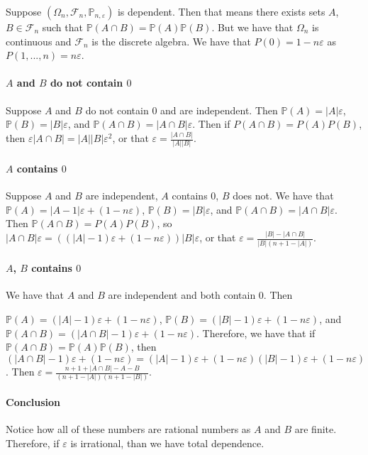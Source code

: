 \documentclass{article}
\theoremstyle{definition}
\numberwithin{theorem}{section}
\numberwithin{equation}{section}
\begin{document}
\par
Suppose $(\Omega_n, \mathcal{F}_n, \mathbb{P}_{n, \varepsilon})$ is dependent. Then that means there exists sets $A$, $B \in \mathcal{F}_n$ such that $\mathbb{P}(A \cap B) = \mathbb{P}(A) \mathbb{P}(B)$. But we have that $\Omega_n$ is continuous and $\mathcal{F}_n$ is the discrete algebra. We have that $P(0) = 1 - n\varepsilon$ as $P({1, ..., n}) = n \varepsilon$. 

\paragraph{$A$ and $B$ do not contain $0$}
Suppose $A$ and $B$ do not contain $0$ and are independent. Then $\mathbb{P}(A) = |A| \varepsilon$, $\mathbb{P}(B) = |B| \varepsilon$, and $\mathbb{P}(A \cap B) = |A \cap B| \varepsilon$. Then if $P(A \cap B) = P(A) P(B)$, then $\varepsilon |A \cap B| = |A| |B| \varepsilon^2$, or that $\varepsilon = \frac{|A \cap B|}{|A| |B|}$. 

\paragraph{$A$ contains $0$}
Suppose $A$ and $B$ are independent, $A$ contains $0$, $B$ does not. 
We have that $\mathbb{P}(A) = |A - 1| \varepsilon + (1 - n \varepsilon)$, $\mathbb{P}(B) = |B| \varepsilon$, and $\mathbb{P}(A \cap B) = |A \cap B| \varepsilon$. Then $\mathbb{P}(A \cap B) = P(A) P(B)$, so $ |A \cap B| \varepsilon = ((|A| - 1) \varepsilon + (1 - n \varepsilon))|B| \varepsilon$, or that $\varepsilon = \frac{|B| - |A \cap B|}{|B|(n + 1 - |A|)}$. 

\paragraph{$A$, $B$ contains $0$}
We have that $A$ and $B$ are independent and both contain $0$. Then 

$\mathbb{P}(A) = (|A| - 1) \varepsilon + (1 - n \varepsilon)$, $\mathbb{P}(B) = (|B| - 1) \varepsilon + (1 - n \varepsilon)$, and $\mathbb{P}(A \cap B) = (|A \cap B| - 1) \varepsilon + (1 - n \varepsilon)$. Therefore, we have that if $\mathbb{P}(A \cap B) = \mathbb{P}(A)\mathbb{P}(B)$, then $(|A \cap B| - 1) \varepsilon + (1 - n \varepsilon) = (|A| - 1) \varepsilon + (1 - n \varepsilon)(|B| - 1) \varepsilon + (1 - n \varepsilon)$. Then $\varepsilon = \frac{n + 1 + |A \cap B| - A - B}{(n + 1 - |A|)(n + 1 - |B|)}$.
\paragraph{Conclusion}
Notice how all of these numbers are rational numbers as $A$ and $B$ are finite. Therefore, if $\varepsilon$ is irrational, than we have total dependence.
\end{document}
